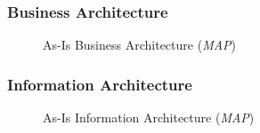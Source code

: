 \subsubsection{Business Architecture}
\begin{center}
	\begin{figure}[H]
		\centering
		\setlength\fboxsep{7pt}
		\setlength\fboxrule{0.5pt}
		\caption{As-Is Business Architecture (\emph{MAP})}
		\label{fig:map_business_as_is}
	\end{figure}
\end{center}
%
\subsubsection{Information Architecture}
\begin{center}
	\begin{figure}[H]
		\centering
		\setlength\fboxsep{7pt}
		\setlength\fboxrule{0.5pt}
		\caption{As-Is Information Architecture (\emph{MAP})}
		\label{fig:map_application_as_is}
	\end{figure}
\end{center}
%

